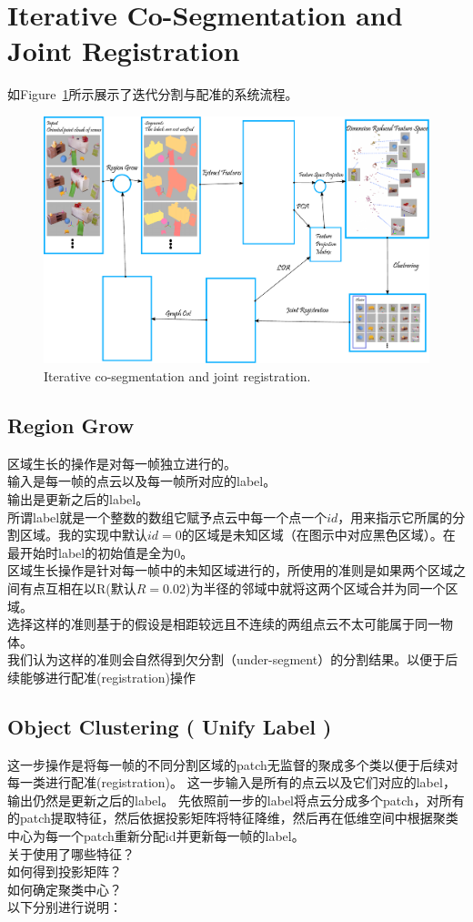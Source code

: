 \section{Iterative Co-Segmentation and Joint Registration}
\label{sec:segmentation}
如Figure~\ref{fig:iterative-segmentation-registration}所示展示了迭代分割与配准的系统流程。
\begin{figure}
	\includegraphics[width=1.0\textwidth]{figures/hsy/overview}
	\caption{Iterative co-segmentation and joint registration.}
	\label{fig:iterative-segmentation-registration}
\end{figure}
\subsection{Region Grow}
区域生长的操作是对每一帧独立进行的。\\
输入是每一帧的点云以及每一帧所对应的label。\\
输出是更新之后的label。 \\
所谓label就是一个整数的数组它赋予点云中每一个点一个$id$，用来指示它所属的分割区域。我的实现中默认$id=0$的区域是未知区域（在图示中对应黑色区域）。在最开始时label的初始值是全为0。\\
区域生长操作是针对每一帧中的未知区域进行的，所使用的准则是如果两个区域之间有点互相在以R(默认$R=0.02$)为半径的邻域中就将这两个区域合并为同一个区域。\\
选择这样的准则基于的假设是相距较远且不连续的两组点云不太可能属于同一物体。\\
我们认为这样的准则会自然得到欠分割（under-segment）的分割结果。以便于后续能够进行配准(registration)操作\\
\subsection{Object Clustering ( Unify Label )}
这一步操作是将每一帧的不同分割区域的patch无监督的聚成多个类以便于后续对每一类进行配准(registration)。
这一步输入是所有的点云以及它们对应的label，输出仍然是更新之后的label。
先依照前一步的label将点云分成多个patch，对所有的patch提取特征，然后依据投影矩阵将特征降维，然后再在低维空间中根据聚类中心为每一个patch重新分配id并更新每一帧的label。\\
关于使用了哪些特征？\\
如何得到投影矩阵？\\
如何确定聚类中心？\\
以下分别进行说明：
